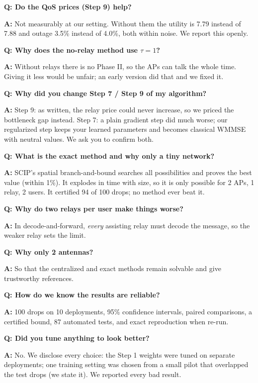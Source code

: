 \documentclass[11pt,a4paper]{article}
\newenvironment{qa}[1]{\par\medskip\textbf{Q: #1}\par\noindent\textbf{A:} }{\par}
\begin{document}
\begin{qa}{Do the QoS prices (Step 9) help?}
Not measurably at our setting. Without them the utility is 7.79 instead of 7.88 and outage 3.5\% instead of
4.0\%, both within noise. We report this openly.
\end{qa}

\begin{qa}{Why does the no-relay method use $\tau = 1$?}
Without relays there is no Phase II, so the APs can talk the whole time. Giving it less would be unfair; an early
version did that and we fixed it.
\end{qa}

\begin{qa}{Why did you change Step 7 / Step 9 of my algorithm?}
Step 9: as written, the relay price could never increase, so we priced the bottleneck gap instead. Step 7: a plain
gradient step did much worse; our regularized step keeps your learned parameters and becomes classical WMMSE with
neutral values. We ask you to confirm both.
\end{qa}

\begin{qa}{What is the exact method and why only a tiny network?}
SCIP's spatial branch-and-bound searches all possibilities and proves the best value (within 1\%). It explodes in
time with size, so it is only possible for 2 APs, 1 relay, 2 users. It certified 94 of 100 drops; no method ever
beat it.
\end{qa}

\begin{qa}{Why do two relays per user make things worse?}
In decode-and-forward, \emph{every} assisting relay must decode the message, so the weaker relay sets the limit.
\end{qa}

\begin{qa}{Why only 2 antennas?}
So that the centralized and exact methods remain solvable and give trustworthy references.
\end{qa}

\begin{qa}{How do we know the results are reliable?}
100 drops on 10 deployments, 95\% confidence intervals, paired comparisons, a certified bound, 87 automated
tests, and exact reproduction when re-run.
\end{qa}

\begin{qa}{Did you tune anything to look better?}
No. We disclose every choice: the Step 1 weights were tuned on separate deployments; one training setting was
chosen from a small pilot that overlapped the test drops (we state it). We reported every bad result.
\end{qa}
\end{document}
